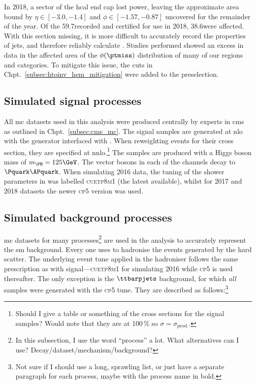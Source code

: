 In 2018, a sector of the \acrshort{hcal} end cap lost power, leaving the approximate area bound by $\eta \in [-\text{3.0}, -\text{1.4}]$ and $\phi \in [-\text{1.57}, -\text{0.87}]$ uncovered for the remainder of the year. Of the 59.7\fbinv recorded and certified for use in 2018, 38.6\fbinv were affected. With this section missing, it is more difficult to accurately record the properties of \glspl{jet}, and therefore reliably calculate \ptmiss. Studies performed showed an excess in data in the affected area of the $\phi(\ptmiss)$ distribution of many of our regions and categories. To mitigate this issue, the cuts in Chpt.~\ref{subsec:htoinv_hem_mitigation} were added to the preselection.




\subsection{Simulated signal processes}
\label{subsec:htoinv_signal}

All \acrlong{mc} datasets used in this analysis were produced centrally by experts in \acrshort{cms} as outlined in Chpt.~\ref{subsec:cms_mc}. The signal samples are generated at \acrshort{nlo} with the \POWHEG generator interfaced with \PYTHIAEIGHT. When reweighting events for their cross section, they are specified at \acrshort{nnlo}.\footnote{Should I give a table or something of the cross sections for the signal samples? Would note that they are at 100\,\% \BR so $\sigma = \sigma_{\mathrm{prod.}}$.} The samples are produced with a Higgs boson mass of $m_{\PH} = \text{125}\GeV$. The vector bosons in each of the \VH channels decay to $\Pquark\APquark$. When simulating 2016 data, the tuning of the shower parameters in \PYTHIA was labelled \textsc{cuetp8m1} (the latest available), whilst for 2017 and 2018 datasets the newer \textsc{cp5} version was used.




\subsection{Simulated background processes}
\label{subsec:htoinv_background}

\acrlong{mc} datasets for many processes\footnote{In this subsection, I use the word ``process'' a lot. What alternatives can I use? Decay/dataset/mechanism/background?} are used in the analysis to accurately represent the \acrlong{sm} background. Every one uses \PYTHIAEIGHT to hadronise the events generated by the hard scatter. The underlying event tune applied in the hadroniser follows the same prescription as with signal---\textsc{cuetp8m1} for simulating 2016 while \textsc{cp5} is used thereafter. The only exception is the $\ttbarpjets$ background, for which \emph{all} samples were generated with the \textsc{cp5} tune. They are described as follows:\footnote{Not sure if I should use a long, sprawling list, or just have a separate paragraph for each process, maybe with the process name in bold.}

